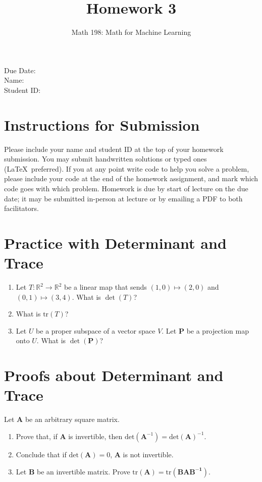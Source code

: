 \documentclass{article}
\title{Homework 3}
\author{Math 198: Math for Machine Learning}
\date{}
\begin{document}
\maketitle

\noindent
Due Date:  \\
Name: \\
Student ID:

\section*{Instructions for Submission}
Please include your name and student ID at the top of your homework submission. You may submit handwritten solutions or typed ones (\LaTeX\ preferred). If you at any point write code to help you solve a problem, please include your code at the end of the homework assignment, and mark which code goes with which problem. Homework is due by start of lecture on the due date; it may be submitted in-person at lecture or by emailing a PDF to both facilitators.

\section{Practice with Determinant and Trace}
\begin{enumerate}
\item Let $T: \mathbb{R}^2 \to \mathbb{R}^2$ be a linear map that sends $(1,0) \mapsto (2,0)$ and $(0,1) \mapsto (3,4)$. What is $\det(T)$? 
\item What is $\text{tr}(T)$?
\item Let $U$ be a proper subspace of a vector space $V$. Let $\mathbf{P}$ be a projection map onto $U$. What is $\det(\mathbf{P})$? 
\end{enumerate}

\section{Proofs about Determinant and Trace}
\noindent Let $\mathbf{A}$ be an arbitrary square matrix.
\begin{enumerate}
\item Prove that, if $\mathbf{A}$ is invertible, then $\text{det}(\mathbf{A}^{-1}) = \text{det}(\mathbf{A})^{-1}$.
\item Conclude that if $\text{det}(\mathbf{A}) = 0$, $\mathbf{A}$ is not invertible.
\item Let $\mathbf{B}$ be an invertible matrix. Prove $\text{tr}(\mathbf{A}) = \text{tr}(\mathbf{BAB^{-1}})$.
\end{enumerate}
\end{document}
